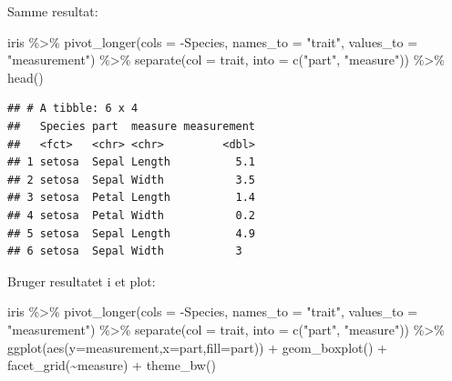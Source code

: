 \documentclass[
]{book}
\newenvironment{Shaded}{\begin{snugshade}}{\end{snugshade}}
\newcommand{\AttributeTok}[1]{\textcolor[rgb]{0.77,0.63,0.00}{#1}}
\newcommand{\FunctionTok}[1]{\textcolor[rgb]{0.00,0.00,0.00}{#1}}
\newcommand{\NormalTok}[1]{#1}
\newcommand{\SpecialCharTok}[1]{\textcolor[rgb]{0.00,0.00,0.00}{#1}}
\newcommand{\StringTok}[1]{\textcolor[rgb]{0.31,0.60,0.02}{#1}}
\begin{document}
Samme resultat:

\begin{Shaded}
\begin{Highlighting}[]
\NormalTok{iris }\SpecialCharTok{\%\textgreater{}\%}
  \FunctionTok{pivot\_longer}\NormalTok{(}\AttributeTok{cols =} \SpecialCharTok{{-}}\NormalTok{Species, }\AttributeTok{names\_to =} \StringTok{"trait"}\NormalTok{, }\AttributeTok{values\_to =} \StringTok{"measurement"}\NormalTok{) }\SpecialCharTok{\%\textgreater{}\%}
  \FunctionTok{separate}\NormalTok{(}\AttributeTok{col =}\NormalTok{ trait, }\AttributeTok{into =} \FunctionTok{c}\NormalTok{(}\StringTok{"part"}\NormalTok{, }\StringTok{"measure"}\NormalTok{)) }\SpecialCharTok{\%\textgreater{}\%} 
  \FunctionTok{head}\NormalTok{()}
\end{Highlighting}
\end{Shaded}

\begin{verbatim}
## # A tibble: 6 x 4
##   Species part  measure measurement
##   <fct>   <chr> <chr>         <dbl>
## 1 setosa  Sepal Length          5.1
## 2 setosa  Sepal Width           3.5
## 3 setosa  Petal Length          1.4
## 4 setosa  Petal Width           0.2
## 5 setosa  Sepal Length          4.9
## 6 setosa  Sepal Width           3
\end{verbatim}

Bruger resultatet i et plot:

\begin{Shaded}
\begin{Highlighting}[]
\NormalTok{iris }\SpecialCharTok{\%\textgreater{}\%}
  \FunctionTok{pivot\_longer}\NormalTok{(}\AttributeTok{cols =} \SpecialCharTok{{-}}\NormalTok{Species, }\AttributeTok{names\_to =} \StringTok{"trait"}\NormalTok{, }\AttributeTok{values\_to =} \StringTok{"measurement"}\NormalTok{) }\SpecialCharTok{\%\textgreater{}\%}
  \FunctionTok{separate}\NormalTok{(}\AttributeTok{col =}\NormalTok{ trait, }\AttributeTok{into =} \FunctionTok{c}\NormalTok{(}\StringTok{"part"}\NormalTok{, }\StringTok{"measure"}\NormalTok{)) }\SpecialCharTok{\%\textgreater{}\%}
  \FunctionTok{ggplot}\NormalTok{(}\FunctionTok{aes}\NormalTok{(}\AttributeTok{y=}\NormalTok{measurement,}\AttributeTok{x=}\NormalTok{part,}\AttributeTok{fill=}\NormalTok{part)) }\SpecialCharTok{+} 
  \FunctionTok{geom\_boxplot}\NormalTok{() }\SpecialCharTok{+} 
  \FunctionTok{facet\_grid}\NormalTok{(}\SpecialCharTok{\textasciitilde{}}\NormalTok{measure) }\SpecialCharTok{+}
  \FunctionTok{theme\_bw}\NormalTok{()}
\end{Highlighting}
\end{Shaded}
\end{document}
